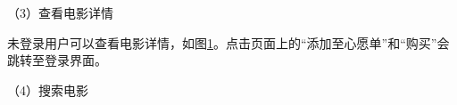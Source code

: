 \documentclass{bjfuthesis}
\begin{document}
\noindent （3）查看电影详情

未登录用户可以查看电影详情，如图\ref{fig:anonymous-details}。点击页面上的“添加至心愿单”和“购买”会跳转至登录界面。
\begin{figure}
	\label{fig:anonymous-details}
\end{figure}

\noindent （4）搜索电影
\end{document}
